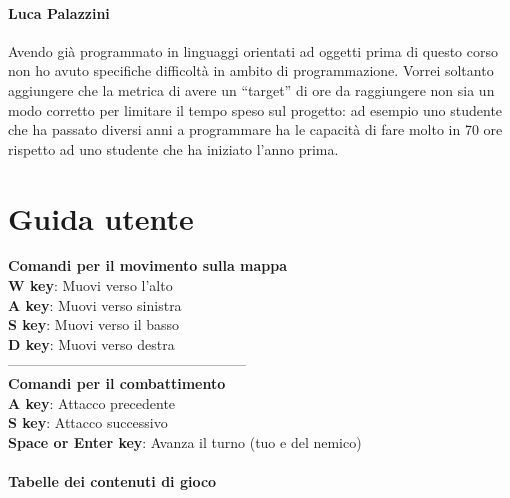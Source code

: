 \documentclass[a4paper,12pt]{report}
\begin{document}
\subsubsection{Luca Palazzini}
Avendo già programmato in linguaggi orientati ad oggetti prima di questo corso non ho avuto specifiche difficoltà in ambito di programmazione. 
%
Vorrei soltanto aggiungere che la metrica di avere un “target” di ore da raggiungere non sia un modo corretto per limitare il tempo speso sul progetto: ad esempio uno studente che ha passato diversi anni a programmare ha le capacità di fare molto in 70 ore rispetto ad uno studente che ha iniziato l’anno prima.
\appendix
\chapter{Guida utente}
\textbf{Comandi per il movimento sulla mappa} \\
\textbf{W key}: Muovi verso l'alto \\
\textbf{A key}: Muovi verso sinistra \\
\textbf{S key}: Muovi verso il basso \\
\textbf{D key}: Muovi verso destra \\
--------------------------------------------------- \\
\textbf{Comandi per il combattimento} \\
\textbf{A key}: Attacco precedente \\
\textbf{S key}: Attacco successivo \\
\textbf{Space or Enter key}: Avanza il turno (tuo e del nemico) \\ \\
\textbf{Tabelle dei contenuti di gioco} \\
\tiny
\end{document}
